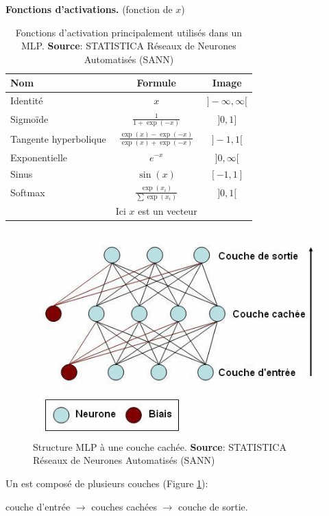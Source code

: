 \begin{table}
 \centering
 \textbf{Fonctions d'activations.} (fonction de $x$)\\
 \begin{tabular}{|l|c|c|}
  \hline
  Nom & Formule & Image\\
  \hline
  Identité & $x$ & $]-\infty,\infty[$\\
  \hline
  Sigmoïde & $\frac{1}{1+\exp{(-x)}}$ & $]0,1]$\\
  \hline
  Tangente hyperbolique & $\frac{\exp{(x)}-\exp{(-x)}}{\exp{(x)}+\exp{(-x)}}$ & $]-1,1[$\\
  \hline
  Exponentielle & $e^{-x}$ & $]0,\infty[$\\
  \hline
  Sinus & $\sin{(x)}$ & $[-1,1]$\\
  \hline
  Softmax & $\frac{\exp{(x_i)}}{\sum{\exp{(x_i)}}}$ & $]0,1[$\\
   & \small Ici $x$ est un vecteur & \\
  \hline
 \end{tabular}
 \caption{Fonctions d'activation principalement utilisés dans un MLP. \textbf{Source}: STATISTICA Réseaux de Neurones Automatisés (SANN)\cite{statistica}}
 \label{mlpfonc}
\end{table}
\begin{figure}
 \centering
 \includegraphics[scale=0.5]{../figures/mlpdiagram.jpg}
 \caption{Structure MLP à une couche cachée. \textbf{Source}: STATISTICA Réseaux de Neurones Automatisés (SANN)\cite{statistica}}
 \label{structuremlp}
\end{figure}
Un \mlp est composé de plusieurs couches (Figure \ref{structuremlp}):
\begin{center}
 couche d'entrée $\rightarrow$ couches cachées $\rightarrow$ couche de sortie.
\end{center}
